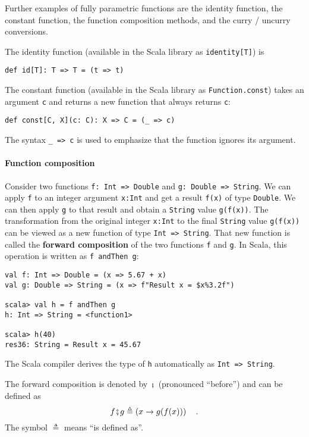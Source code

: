 Further examples of fully parametric functions are the identity function,
the constant function, the function composition methods, and the curry
/ uncurry conversions. 

The identity function (available in the
Scala library as \lstinline!identity[T]!) is
\begin{lstlisting}
def id[T]: T => T = (t => t)
\end{lstlisting}
The constant function (available in the
Scala library as \lstinline!Function.const!) takes an argument \lstinline!c!
and returns a new function that always returns \lstinline!c!:
\begin{lstlisting}
def const[C, X](c: C): X => C = (_ => c)
\end{lstlisting}
The syntax \lstinline!_ => c! is used to emphasize that the function
ignores its argument.

\paragraph{Function composition}

Consider two functions \lstinline!f: Int => Double!
and \lstinline!g: Double => String!. We can apply \lstinline!f!
to an integer argument \lstinline!x:Int! and get a result \lstinline!f(x)!
of type \lstinline!Double!. We can then apply \lstinline!g! to that
result and obtain a \lstinline!String! value \lstinline!g(f(x))!.
The transformation from the original integer \lstinline!x:Int! to
the final \lstinline!String! value \lstinline!g(f(x))! can be viewed
as a new function of type \lstinline!Int => String!. That new function
is called the \textbf{forward composition}
of the two functions \lstinline!f! and \lstinline!g!. In Scala,
this operation is written as \lstinline!f andThen g!:
\begin{lstlisting}
val f: Int => Double = (x => 5.67 + x)
val g: Double => String = (x => f"Result x = $x%3.2f")

scala> val h = f andThen g
h: Int => String = <function1>

scala> h(40)
res36: String = Result x = 45.67
\end{lstlisting}
The Scala compiler derives the type of \lstinline!h! automatically
as \lstinline!Int => String!.

The forward composition is denoted by $\bef$ (pronounced ``before'')
and can be defined as
\begin{equation}
f\bef g\triangleq\left(x\Rightarrow g(f(x))\right)\quad.\label{eq:def-of-forward-composition}
\end{equation}
The symbol $\triangleq$ means ``is defined as''.


